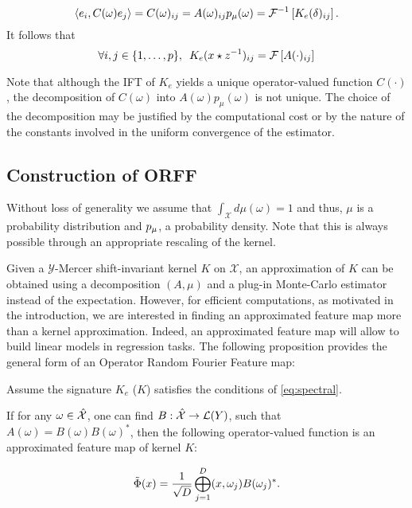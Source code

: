 \begin{equation}
\label{eq:operator_identification_real}\langle e_i,C(\omega)e_j\rangle=C(\omega)_{ij}=A(\omega)_{ij}p_{\mu}(\omega)=\mathcal{F}^{-1}\left[K_e(\delta)_{ij}\right].
\end{equation}
It follows that
\begin{equation}\label{eq:matrix-exp}
\forall i,j \in {\left\{1, \ldots, p\right\}}, \enskip K_e(x\star {z}^{-1})_{ij}= \mathcal{F}\left[A(\cdot)_{ij}\right]
\end{equation}

\begin{remark}
Note that although the \acl{IFT} of $K_e$ yields a unique operator-valued function $C(\cdot)$, the decomposition of $C(\omega)$ into $A(\omega)p_\mu(\omega)$ is not unique. The choice of the decomposition may be justified by the computational cost or by the nature of the constants involved in the uniform convergence of the estimator.
\end{remark}

\subsection{Construction of ORFF}
Without loss of generality we assume that $\int_{\mathcal{X}} d\mu(\omega)=1$ and thus, $\mu$ is a probability distribution and $p_{\mu}$, a probability density. Note that this is always possible through an appropriate rescaling of the kernel.

Given a $\mathcal{Y}$-Mercer shift-invariant kernel $K$ on $\mathcal{X}$, an approximation of $K$ can be obtained using a decomposition $(A, \mu)$ and a plug-in Monte-Carlo estimator instead of the expectation. However, for efficient computations, as motivated in the introduction, we are interested in finding an approximated feature map more than a kernel approximation. Indeed, an approximated feature map will allow to build linear models in regression tasks. The following proposition provides the general form of an Operator Random Fourier Feature map:
\begin{proposition}\label{pr:ORFF-map}
Assume the signature $K_e$ ($K$) satisfies the conditions of \cref{eq:spectral}.

If  for any $\omega \in \hat{\mathcal{X}}$, one can find $B: \hat{\mathcal{X}} \to \mathcal{L}(Y)$, such that $A(\omega)=B(\omega)B(\omega)^*$, then the following operator-valued function is an approximated feature map of kernel $K$:

\begin{equation}\label{eq:phitilde}
\tilde{\Phi}(x)= \frac{1}{\sqrt{D}}\operatorname*{\bigoplus}_{j=1}^D(x, \omega_j)B(\omega_j)^*.
\end{equation}
\end{proposition}

